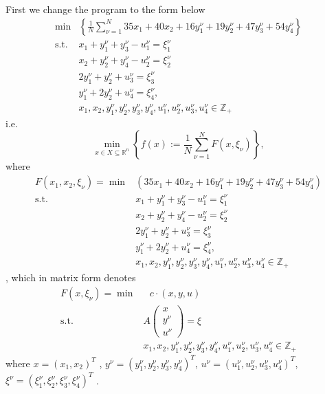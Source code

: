 \documentclass{article}
\theoremstyle{plain}
\theoremstyle{definition}
\begin{document}
\begin{propsition}
First we change the program to the form below
\begin{align*}
\min & \left\{\frac{1}{N} \sum_{\nu=1}^{N} 35 x_{1}+40 x_{2}+ 16 y_{1}^{\nu}+19 y_{2}^{\nu}+47 y_{3}^{\nu}+54 y_{4}^{\nu}\right\} \\
\text{s.t. }  & x_{1}+y_{1}^{\nu}+y_{3}^{\nu} -u_1^{\nu} = \xi_{1}^{\nu} \\
& x_{2}+y_{2}^{\nu}+y_{4}^{\nu} -u_2^{\nu}  = \xi_{2}^{\nu} \\
& 2 y_{1}^{\nu}+y_{2}^{\nu} +u_3^{\nu} = \xi_{3}^{\nu} \\
& y_{1}^{\nu}+2 y_{2}^{\nu}  + u_4^{\nu} =  \xi_{4}^{\nu}, \\
& x_{1}, x_{2}, y_{1}^{\nu}, y_{2}^{\nu}, y_{3}^{\nu}, y_{4}^{\nu}, u_{1}^{\nu}, u_{2}^{\nu}, u_{3}^{\nu}, u_{4}^{\nu} \in \mathbb{Z}_{+}
\end{align*}
i.e. 
$$
\min _{x \in X \subseteq \mathbb{R}^{n}}\left\{f(x):=\frac{1}{N} \sum_{\nu=1}^{N} F\left(x, \xi_{\nu}\right)\right\},
$$
where \begin{align*}
 F\left(x_1,x_2, \xi_{\nu}\right)=\min &\left(35 x_{1}+40 x_{2}+ 16 y_{1}^{\nu}+19 y_{2}^{\nu}+47 y_{3}^{\nu}+54 y_{4}^{\nu} \right) \\
\text{s.t. }  & x_{1}+y_{1}^{\nu}+y_{3}^{\nu} -u_1^{\nu} = \xi_{1}^{\nu} \\
& x_{2}+y_{2}^{\nu}+y_{4}^{\nu} -u_2^{\nu}  = \xi_{2}^{\nu} \\
& 2 y_{1}^{\nu}+y_{2}^{\nu} +u_3^{\nu} = \xi_{3}^{\nu} \\
& y_{1}^{\nu}+2 y_{2}^{\nu}  + u_4^{\nu} =  \xi_{4}^{\nu}, \\
& x_{1}, x_{2}, y_{1}^{\nu}, y_{2}^{\nu}, y_{3}^{\nu}, y_{4}^{\nu}, u_{1}^{\nu}, u_{2}^{\nu}, u_{3}^{\nu}, u_{4}^{\nu} \in \mathbb{Z}_{+}
\end{align*}, which in matrix form denotes
\begin{align*}
 F\left(x, \xi_{\nu}\right)=\min & \text{ } c\cdot (x,y,u) \\
\text{s.t. }  &  A\begin{pmatrix} x \\ y^{\nu} \\ u^{\nu} \end{pmatrix} = \xi\\
& x_{1}, x_{2}, y_{1}^{\nu}, y_{2}^{\nu}, y_{3}^{\nu}, y_{4}^{\nu}, u_{1}^{\nu}, u_{2}^{\nu}, u_{3}^{\nu}, u_{4}^{\nu} \in \mathbb{Z}_{+}
\end{align*}
where $x = (x_1,x_2)^{T}$ , $y^{\nu} =(y_{1}^{\nu},y_{2}^{\nu},y_{3}^{\nu},y_{4}^{\nu})^{T}$,  $u^{\nu} =(u_{1}^{\nu},u_{2}^{\nu},u_{3}^{\nu},u_{4}^{\nu})^{T}$, $\xi^{\nu} =(\xi_{1}^{\nu},\xi_{2}^{\nu},\xi_{3}^{\nu},\xi_{4}^{\nu})^{T}$ .


\end{propsition}
\end{document}
